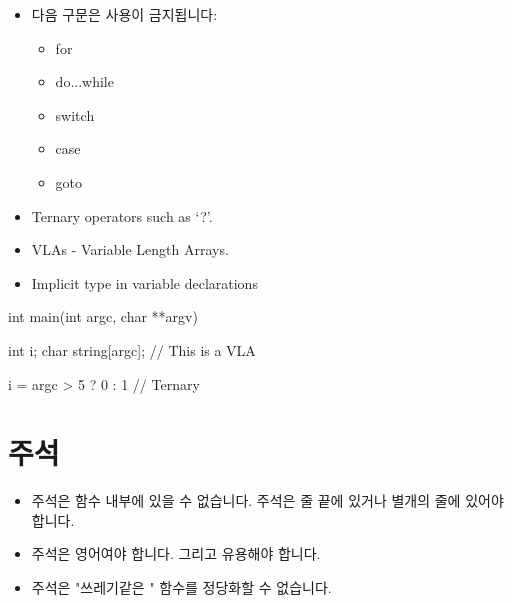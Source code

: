 \documentclass{42-ko}
\begin{document}
        \begin{itemize}

            \item 다음 구문은 사용이 금지됩니다:

                \begin{itemize}

                    \item for
                    \item do...while
                    \item switch
                    \item case
                    \item goto

                \end{itemize}

            \item Ternary operators such as `?'.

            \item VLAs - Variable Length Arrays.

            \item Implicit type in variable declarations

        \end{itemize}
        \begin{42ccode}
    int main(int argc, char **argv)
    {
        int     i;
        char    string[argc]; // This is a VLA

        i = argc > 5 ? 0 : 1 // Ternary
    }
        \end{42ccode}
        \newpage

    \section{주석}

        \begin{itemize}

            \item 주석은 함수 내부에 있을 수 없습니다. 
				주석은 줄 끝에 있거나 별개의 줄에 있어야 합니다.

            \item 주석은 영어여야 합니다. 그리고 유용해야 합니다.

            \item 주석은 "쓰레기같은 " 함수를 정당화할 수 없습니다.

        \end{itemize}
        \newpage
\end{document}
